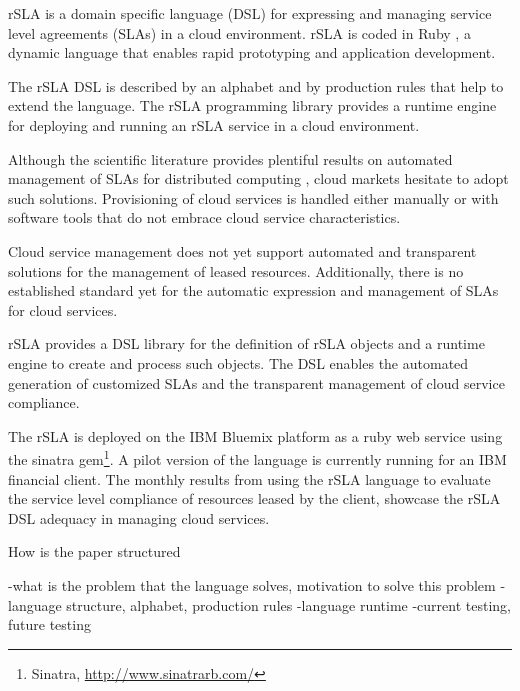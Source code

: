 rSLA is a domain specific language (DSL) for expressing and managing service level agreements (SLAs) in a cloud environment. rSLA is coded in Ruby \cite{ruby}, a dynamic language that enables rapid prototyping and application development. 

The rSLA DSL is described by an alphabet and by production rules that help to extend the language. The rSLA programming library provides a runtime engine for deploying and running an rSLA service in a cloud environment.

Although the scientific literature provides plentiful results on automated management of SLAs for distributed computing \cite{wsla, wsag}, cloud markets hesitate to adopt such solutions. Provisioning of cloud services is handled either manually or with software tools that do not embrace cloud service characteristics.

Cloud service management does not yet support automated and transparent solutions for the management of leased resources. Additionally, there is no established standard yet for the automatic expression and management of SLAs for cloud services.

rSLA provides a DSL library for the definition of rSLA objects and a runtime engine to create and process such objects. The DSL enables the automated generation of customized SLAs and the transparent management of cloud service compliance.

The rSLA is deployed on the IBM Bluemix platform \cite{bluemix} as a ruby web service using the sinatra gem\footnote{Sinatra, \url{http://www.sinatrarb.com/}}. A pilot version of the language is currently running for an IBM financial client. The monthly results from using the rSLA language to evaluate the service level compliance of resources leased by the client, showcase the rSLA DSL adequacy in managing cloud services.

How is the paper structured

-what is the problem that the language solves, motivation to solve this problem
-language structure, alphabet, production rules
-language runtime
-current testing, future testing